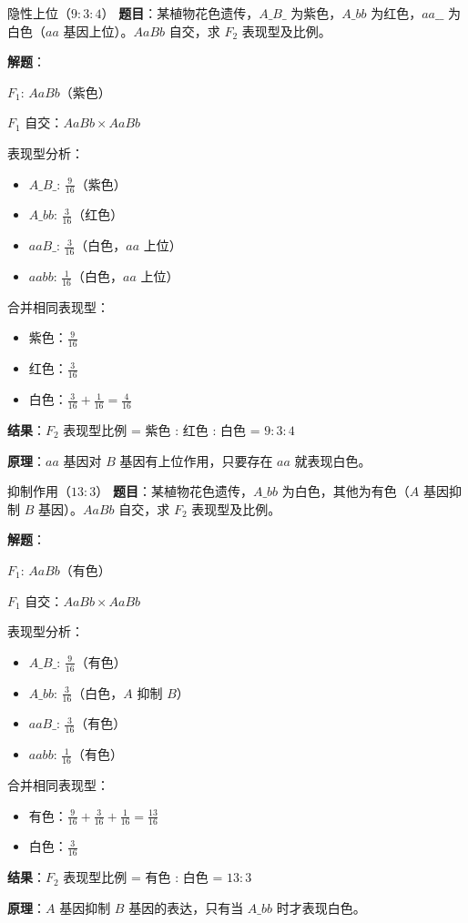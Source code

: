 \documentclass[a4paper,11pt]{ctexart}
\begin{document}
\begin{examplebox}{隐性上位（$9:3:4$）}
\textbf{题目}：某植物花色遗传，$A\_B\_$ 为紫色，$A\_bb$ 为红色，$aa\_\_$ 为白色（$aa$ 基因上位）。$AaBb$ 自交，求 $F_2$ 表现型及比例。

\textbf{解题}：

$F_1$: $AaBb$（紫色）

$F_1$ 自交：$AaBb \times AaBb$

表现型分析：
\begin{itemize}[leftmargin=2em]
    \item $A\_B\_$: $\frac{9}{16}$（紫色）
    \item $A\_bb$: $\frac{3}{16}$（红色）
    \item $aaB\_$: $\frac{3}{16}$（白色，$aa$ 上位）
    \item $aabb$: $\frac{1}{16}$（白色，$aa$ 上位）
\end{itemize}

合并相同表现型：
\begin{itemize}[leftmargin=2em]
    \item 紫色：$\frac{9}{16}$
    \item 红色：$\frac{3}{16}$
    \item 白色：$\frac{3}{16} + \frac{1}{16} = \frac{4}{16}$
\end{itemize}

\textbf{结果}：$F_2$ 表现型比例 = 紫色 : 红色 : 白色 = $9:3:4$

\textbf{原理}：$aa$ 基因对 $B$ 基因有上位作用，只要存在 $aa$ 就表现白色。
\end{examplebox}

\begin{examplebox}{抑制作用（$13:3$）}
\textbf{题目}：某植物花色遗传，$A\_bb$ 为白色，其他为有色（$A$ 基因抑制 $B$ 基因）。$AaBb$ 自交，求 $F_2$ 表现型及比例。

\textbf{解题}：

$F_1$: $AaBb$（有色）

$F_1$ 自交：$AaBb \times AaBb$

表现型分析：
\begin{itemize}[leftmargin=2em]
    \item $A\_B\_$: $\frac{9}{16}$（有色）
    \item $A\_bb$: $\frac{3}{16}$（白色，$A$ 抑制 $B$）
    \item $aaB\_$: $\frac{3}{16}$（有色）
    \item $aabb$: $\frac{1}{16}$（有色）
\end{itemize}

合并相同表现型：
\begin{itemize}[leftmargin=2em]
    \item 有色：$\frac{9}{16} + \frac{3}{16} + \frac{1}{16} = \frac{13}{16}$
    \item 白色：$\frac{3}{16}$
\end{itemize}

\textbf{结果}：$F_2$ 表现型比例 = 有色 : 白色 = $13:3$

\textbf{原理}：$A$ 基因抑制 $B$ 基因的表达，只有当 $A\_bb$ 时才表现白色。
\end{examplebox}
\end{document}
